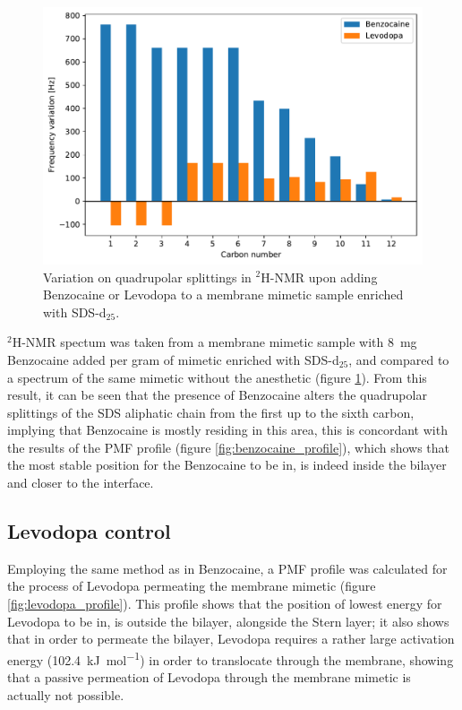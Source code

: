 \documentclass[twoside,twocolumn,9pt]{article}
\begin{document}
\begin{figure}[htb]
  \centering
  \includegraphics[width=\columnwidth]{sds_variation}
  \caption{Variation on quadrupolar splittings in $^2$H-NMR upon adding
    Benzocaine or Levodopa to a membrane mimetic sample enriched with
    SDS-d$_{25}$.}
  \label{fig:sds_benzocaine}
\end{figure}
$^2$H-NMR spectum was taken from a membrane mimetic sample with \SI{8}{mg}
Benzocaine added per gram of mimetic enriched with SDS-d$_{25}$, and compared to
a spectrum of the same mimetic without the anesthetic (figure
\ref{fig:sds_benzocaine}). From this result, it can be seen that the presence of
Benzocaine alters the quadrupolar splittings of the SDS aliphatic chain from the
first up to the sixth carbon, implying that Benzocaine is mostly residing in
this area, this is concordant with the results of the PMF profile (figure
\ref{fig:benzocaine_profile}), which shows that the most stable position for the
Benzocaine to be in, is indeed inside the bilayer and closer to the interface.



\subsection{Levodopa control}
\label{sec:ldopa}

Employing the same method as in Benzocaine, a PMF profile was calculated for the
process of Levodopa permeating the membrane mimetic (figure
\ref{fig:levodopa_profile}). This profile shows that the position of lowest
energy for Levodopa to be in, is outside the bilayer, alongside the Stern layer;
it also shows that in order to permeate the bilayer, Levodopa requires a rather
large activation energy (\SI{102.4}{\kilo\joule\per\mol}) in order to translocate
through the membrane, showing that a passive permeation of Levodopa through the
membrane mimetic is actually not possible.
\end{document}
